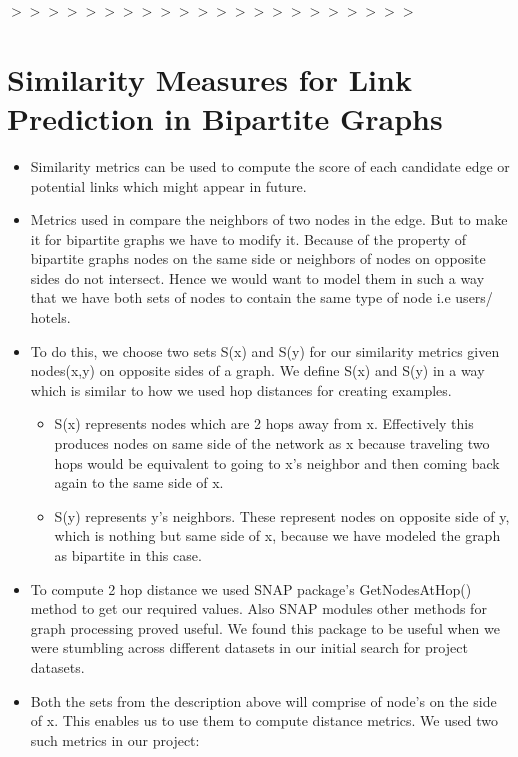 \documentclass[letterpaper,twocolumn,11pt]{article}
\begin{document}
$>>>>>>>>>>>>>>>>>>>>>>$


\section{Similarity Measures for Link Prediction in Bipartite Graphs}

\begin{itemize}

\item Similarity metrics can be used to compute the score of each candidate edge or potential links which might appear in future.

\item Metrics used in \cite{four} compare the neighbors of two nodes in the edge. But to make it for bipartite graphs we have to modify it. Because of the property of bipartite graphs nodes on the same side or neighbors of nodes on opposite sides do not intersect. Hence we would want to model them in such a way that we have both sets of nodes to contain the same type of node i.e users/ hotels.

\item To do this, we choose two sets S(x) and S(y) for our similarity metrics given nodes(x,y) on opposite sides of a graph. We define S(x) and S(y) in a way which is similar to how we used hop distances for creating examples.

\begin{itemize}
\item S(x) represents nodes which are 2 hops away from x. Effectively this produces nodes on same side of the network as x because traveling two hops would be equivalent to going to x's neighbor and then coming back again to the same side of x. 

\item S(y) represents y's neighbors. These represent nodes on opposite side of y, which is nothing but same side of x, because we have modeled the graph as bipartite in this case.
\end{itemize}

\item To compute 2 hop distance we used SNAP package's GetNodesAtHop() method to get our required values. Also SNAP modules other methods for graph processing proved useful. We found this package to be useful when we were stumbling across different datasets in our initial search for project datasets.

\item Both the sets from the description above will comprise of node's on the side of x.  This enables us to use them to compute distance metrics. We used two such metrics in our project:

\end{itemize}
\end{document}
